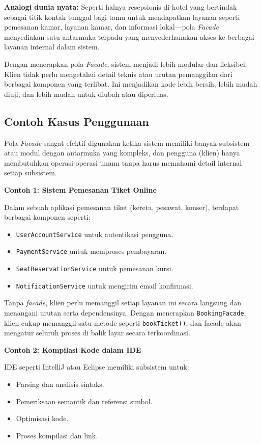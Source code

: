 \textbf{Analogi dunia nyata:} Seperti halnya resepsionis di hotel yang bertindak sebagai titik kontak tunggal bagi tamu untuk mendapatkan layanan seperti pemesanan kamar, layanan kamar, dan informasi lokal—pola \textit{Facade} menyediakan satu antarmuka terpadu yang menyederhanakan akses ke berbagai layanan internal dalam sistem.

Dengan menerapkan pola \textit{Facade}, sistem menjadi lebih modular dan fleksibel. Klien tidak perlu mengetahui detail teknis atau urutan pemanggilan dari berbagai komponen yang terlibat. Ini menjadikan kode lebih bersih, lebih mudah diuji, dan lebih mudah untuk diubah atau diperluas.

\subsection{Contoh Kasus Penggunaan}

Pola \textit{Facade} sangat efektif digunakan ketika sistem memiliki banyak subsistem atau modul dengan antarmuka yang kompleks, dan pengguna (klien) hanya membutuhkan operasi-operasi umum tanpa harus memahami detail internal setiap subsistem.

\textbf{Contoh 1: Sistem Pemesanan Tiket Online}

Dalam sebuah aplikasi pemesanan tiket (kereta, pesawat, konser), terdapat berbagai komponen seperti:
\begin{itemize}
	\item \texttt{UserAccountService} untuk autentikasi pengguna.
	\item \texttt{PaymentService} untuk memproses pembayaran.
	\item \texttt{SeatReservationService} untuk pemesanan kursi.
	\item \texttt{NotificationService} untuk mengirim email konfirmasi.
\end{itemize}

Tanpa \textit{facade}, klien perlu memanggil setiap layanan ini secara langsung dan menangani urutan serta dependensinya. Dengan menerapkan \texttt{BookingFacade}, klien cukup memanggil satu metode seperti \texttt{bookTicket()}, dan facade akan mengatur seluruh proses di balik layar secara terkoordinasi.

\textbf{Contoh 2: Kompilasi Kode dalam IDE}

IDE seperti IntelliJ atau Eclipse memiliki subsistem untuk:
\begin{itemize}
	\item Parsing dan analisis sintaks.
	\item Pemeriksaan semantik dan referensi simbol.
	\item Optimisasi kode.
	\item Proses kompilasi dan link.
\end{itemize}

